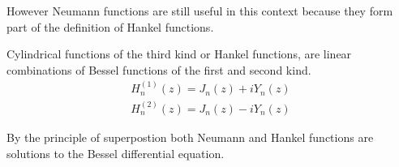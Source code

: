 %
However Neumann functions are still useful in this context because they form part of the definition of Hankel functions. \par
  \begin{defn}\label{defn:hankel_func}
  \parencite{korenev02bessel_func} Cylindrical functions of the third kind or Hankel functions, are linear combinations of Bessel functions of the first and second kind.
      \begin{align*}
          H^{(1)}_n(z) = J_n(z) + i Y_n(z)\\
          H^{(2)}_n(z) = J_n(z) - i Y_n(z)
      \end{align*}
  \end{defn}
By the principle of superpostion both Neumann and Hankel functions are solutions to the Bessel differential equation.
%
